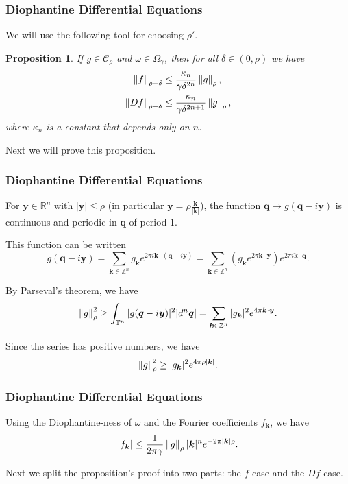 \documentclass{beamer}
\newcommand{\Z}{\mathbb{Z}}
\newcommand{\R}{\mathbb{R}}
\newcommand{\bp}[1]{\bm{#1}}
\newcommand{\genericdel}[4]{%
  \ifcase#3\relax
  #1#4#2\or
  \bigl#1#4\bigr#2\or
  \Bigl#1#4\Bigr#2\or
  \biggl#1#4\biggr#2\or
  \Biggl#1#4\Biggr#2\else
  \left#1#4\right#2\fi
}
\newcommand{\enVert}[2][-1]{\genericdel\|\|{#1}{#2}}
\let\norm\enVert
\begin{document}
\begin{frame}
  \frametitle{Diophantine Differential Equations}
  We will use the following tool for choosing $\rho'$.
  \newtheorem{pickrho}{Proposition}
  \begin{pickrho}
    If $g \in \mathcal{C}_{\rho}$ and $\omega \in \Omega_{\gamma}$, then for all
    $\delta \in (0, \rho)$ we have
    \begin{align*}
      \norm{f}_{\rho - \delta} &\leq \frac{\kappa_n}{\gamma \delta^{2n}}
               \norm{g}_{\rho},\\
      \norm{Df}_{\rho - \delta} &\leq \frac{\kappa_n}{\gamma \delta^{2n+1}}
                \norm{g}_{\rho},\\
    \end{align*}
    where $\kappa_n$ is a constant that depends only on $n$.
  \end{pickrho}
  Next we will prove this proposition.
\end{frame}

\begin{frame}
  \frametitle{Diophantine Differential Equations}
  For $\bp{y} \in \R^n$ with $|\bp{y}| \leq \rho$ (in particular $\bp{y} =
  \rho\frac{\bp{k}}{|\bp{k}|}$), the function $\bp{q} \mapsto
  g(\bp{q} - i \bp{y})$ is continuous and periodic in $\bp{q}$ of period $1$.

  This function can be written
  \begin{equation*}
    g(\bp{q} - i \bp{y}) = \sum_{\bp{k} \in \Z^n} g_{\bp{k}}e^{2 \pi i \bp{k}
      \cdot (\bp{q} - i \bp{y})} = \sum_{\bp{k} \in \Z^n} \left( g_{\bp{k}} e^{2
      \pi \bp{k} \cdot \bp{y}} \right) e^{2 \pi i \bp{k} \cdot \bp{q}}.
  \end{equation*}

  By Parseval's theorem, we have
  \begin{equation*}
    \norm{g}_{\rho}^2 \geq \int_{\mathbb{T}^n} |g(\bp{q} - i \bp{y})|^2 |d^n
    \bp{q}| = \sum_{\bp{k} \in \Z^n} |g_{\bp{k}}|^2 e^{4 \pi \bp{k} \cdot \bp{y}}.
  \end{equation*}

  Since the series has positive numbers, we have
  \begin{equation*}
    \norm{g}_{\rho}^2 \geq |g_{\bp{k}}|^2 e^{4 \pi \rho |\bp{k}|}.
  \end{equation*}
\end{frame}

\begin{frame}
  \frametitle{Diophantine Differential Equations}
  Using the Diophantine-ness of $\omega$ and the Fourier coefficients
  $f_{\bp{k}}$, we have
  \begin{equation*}
    |f_{\bp{k}}| \leq \frac{1}{2 \pi \gamma} \norm{g}_{\rho} |\bp{k}|^n e^{-2
      \pi |\bp{k}| \rho}.
  \end{equation*}

  Next we split the proposition's proof into two parts: the $f$ case and the
  $Df$ case.
\end{frame}
\end{document}
